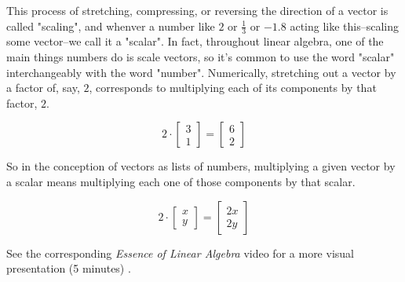 This process of stretching, compressing, or reversing the direction of a vector
is called "scaling", and whenver a number like $2$ or $\frac{1}{3}$ or $-1.8$
acting like this--scaling some vector--we call it a "scalar". In fact,
throughout linear algebra, one of the main things numbers do is scale vectors,
so it's common to use the word "scalar" interchangeably with the word "number".
Numerically, stretching out a vector by a factor of, say, $2$, corresponds to
multiplying each of its components by that factor, $2$.

\begin{equation*}
  2 \cdot \begin{bmatrix}
    3 \\
    1
  \end{bmatrix} = \begin{bmatrix}
    6 \\
    2
  \end{bmatrix}
\end{equation*}

So in the conception of vectors as lists of numbers, multiplying a given vector
by a scalar means multiplying each one of those components by that scalar.

\begin{equation*}
  2 \cdot \begin{bmatrix}
    x \\
    y
  \end{bmatrix} = \begin{bmatrix}
    2x \\
    2y
  \end{bmatrix}
\end{equation*}

\begin{remark}
  See the corresponding \textit{Essence of Linear Algebra} video for a more
  visual presentation (5 minutes) \cite{bib:linalg_vectors}.
\end{remark}
